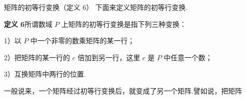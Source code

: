 \begin{fdeep}{矩阵的初等行变换（定义 6）}
下面来定义矩阵的初等行变换.

\textbf{定义 6}\quad 所谓数域 $P$ 上矩阵的初等行变换是指下列三种变换：

1）以 $P$ 中一个非零的数乘矩阵的某一行；

2）把矩阵的某一行的 $c$ 倍加到另一行，这里 $c$ 是 $P$ 中任意一个数；

3）互换矩阵中两行的位置.

一般说来，一个矩阵经过初等行变换后，就变成了另一个矩阵.譬如说，把矩阵
\end{fdeep}

